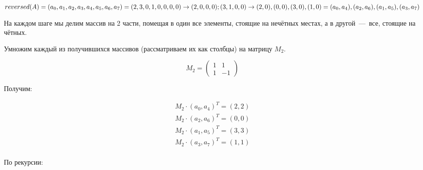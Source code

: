 \documentclass[a4paper,12pt]{article}
\begin{document}
\begin{solution}
	$reversed(A) = (a_0, a_1, a_2, a_3, a_4, a_5, a_6, a_7) = (2,3,0,1,0,0,0,0) \rightarrow (2,0,0,0); (3,1,0,0) \rightarrow (2,0), (0, 0), (3,0), (1,0) = (a_0, a_4), (a_2, a_6), (a_1, a_5), (a_3, a_7)$
	
	На каждом шаге мы делим массив на 2 части, помещая в один все элементы, стоящие на нечётных местах, а в другой~---~все, стоящие на чётных.
	
	Умножим каждый из получившихся массивов (рассматриваем их как столбцы) на матрицу $M_2$.
	
	\begin{equation*}
	M_2 = \left(
	\begin{array}{cc}
	1 & 1 \\
	1 & -1
	\end{array}
	\right)
	\end{equation*}
	
	Получим:
	
	\begin{align*}
	M_2 \cdot (a_0,a_4)^T = (2,2) \\
	M_2 \cdot (a_2,a_6)^T = (0,0) \\
	M_2 \cdot (a_1,a_5)^T = (3,3) \\
	M_2 \cdot (a_3,a_7)^T = (1,1) \\
	\end{align*}
	
	По рекурсии:
	

\end{solution}
\end{document}
